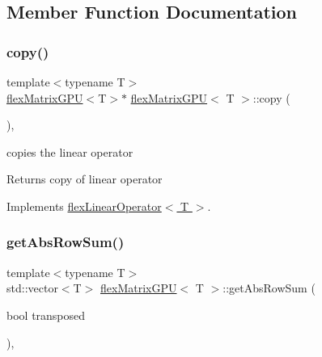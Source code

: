 \subsection{Member Function Documentation}
\mbox{\label{classflex_matrix_g_p_u_a4df27ef284eec123ba72f1b5788f1180}} 
\subsubsection{\texorpdfstring{copy()}{copy()}}
{\footnotesize\ttfamily template$<$typename T$>$ \\
\hyperlink{classflex_matrix_g_p_u}{flex\+Matrix\+G\+PU}$<$T$>$$\ast$ \hyperlink{classflex_matrix_g_p_u}{flex\+Matrix\+G\+PU}$<$ T $>$\+::copy (\begin{DoxyParamCaption}{ }\end{DoxyParamCaption})\hspace{0.3cm}{\ttfamily [inline]}, {\ttfamily [virtual]}}



copies the linear operator 

\begin{DoxyReturn}{Returns}
copy of linear operator 
\end{DoxyReturn}


Implements \hyperlink{classflex_linear_operator_a7cc1425677cc30fcbd092ffd28d508c9}{flex\+Linear\+Operator$<$ T $>$}.

\mbox{\label{classflex_matrix_g_p_u_a0a1f19c482243223b8d98165d0b44ccf}} 
\subsubsection{\texorpdfstring{get\+Abs\+Row\+Sum()}{getAbsRowSum()}}
{\footnotesize\ttfamily template$<$typename T$>$ \\
std\+::vector$<$T$>$ \hyperlink{classflex_matrix_g_p_u}{flex\+Matrix\+G\+PU}$<$ T $>$\+::get\+Abs\+Row\+Sum (\begin{DoxyParamCaption}\item[{bool}]{transposed }\end{DoxyParamCaption})\hspace{0.3cm}{\ttfamily [inline]}, {\ttfamily [virtual]}}



